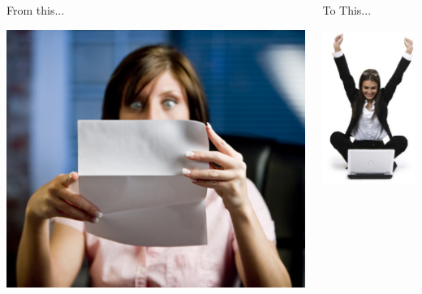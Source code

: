 \documentclass{beamer}
\begin{document}
\begin{frame}
	\begin{columns}[t]
			\begin{block}{From this...}
			\begin{center}
			\includegraphics[scale=.3]{includes/high-utility-bill-shock}
			\end{center}
			\end{block}\pause
			\begin{block}{To This...}
			\begin{center}
			\includegraphics[height=2in]{includes/happyGirl}
			\end{center}
			\end{block}
		\end{columns}
\end{frame}
\end{document}
